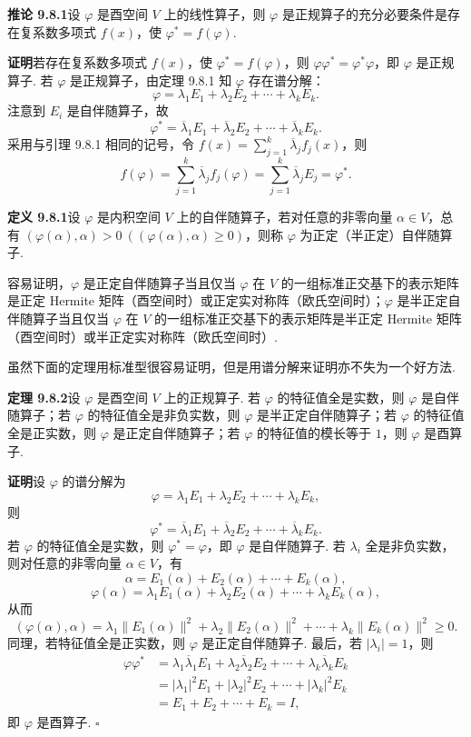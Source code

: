 \documentclass[UTF8,12pt,a4paper,fontset=fandol]{ctexart}
\begin{document}
\noindent\textbf{推论 9.8.1}\quad 设 $\varphi$ 是酉空间 $V$ 上的线性算子，则 $\varphi$ 是正规算子的充分必要条件是存在复系数多项式 $f(x)$，使 $\varphi^*=f(\varphi)$.

\noindent\textbf{证明}\quad 若存在复系数多项式 $f(x)$，使 $\varphi^*=f(\varphi)$，则 $\varphi\varphi^*=\varphi^*\varphi$，即 $\varphi$ 是正规算子. 若 $\varphi$ 是正规算子，由定理 9.8.1 知 $\varphi$ 存在谱分解：
\[
  \varphi=\lambda_1E_1+\lambda_2E_2+\cdots+\lambda_kE_k.
\]
注意到 $E_i$ 是自伴随算子，故
\[
  \varphi^*=\overline\lambda_1E_1+\overline\lambda_2E_2+\cdots+\overline\lambda_kE_k.
\]
采用与引理 9.8.1 相同的记号，令 $f(x)=\sum_{j=1}^k\overline\lambda_j f_j(x)$，则
\[
  f(\varphi)=\sum_{j=1}^k\overline\lambda_j f_j(\varphi)=\sum_{j=1}^k\overline\lambda_j E_j=\varphi^*.
\]

\noindent\textbf{定义 9.8.1}\quad 设 $\varphi$ 是内积空间 $V$ 上的自伴随算子，若对任意的非零向量 $\alpha\in V$，总有 $(\varphi(\alpha),\alpha)>0\ ((\varphi(\alpha),\alpha)\ge0)$，则称 $\varphi$ 为正定（半正定）自伴随算子.

容易证明，$\varphi$ 是正定自伴随算子当且仅当 $\varphi$ 在 $V$ 的一组标准正交基下的表示矩阵是正定 Hermite 矩阵（酉空间时）或正定实对称阵（欧氏空间时）；$\varphi$ 是半正定自伴随算子当且仅当 $\varphi$ 在 $V$ 的一组标准正交基下的表示矩阵是半正定 Hermite 矩阵（酉空间时）或半正定实对称阵（欧氏空间时）.

虽然下面的定理用标准型很容易证明，但是用谱分解来证明亦不失为一个好方法.

\noindent\textbf{定理 9.8.2}\quad 设 $\varphi$ 是酉空间 $V$ 上的正规算子. 若 $\varphi$ 的特征值全是实数，则 $\varphi$ 是自伴随算子；若 $\varphi$ 的特征值全是非负实数，则 $\varphi$ 是半正定自伴随算子；若 $\varphi$ 的特征值全是正实数，则 $\varphi$ 是正定自伴随算子；若 $\varphi$ 的特征值的模长等于 $1$，则 $\varphi$ 是酉算子.

\noindent\textbf{证明}\quad 设 $\varphi$ 的谱分解为
\[
  \varphi=\lambda_1E_1+\lambda_2E_2+\cdots+\lambda_kE_k,
\]
则
\[
  \varphi^*=\overline\lambda_1E_1+\overline\lambda_2E_2+\cdots+\overline\lambda_kE_k.
\]
若 $\varphi$ 的特征值全是实数，则 $\varphi^*=\varphi$，即 $\varphi$ 是自伴随算子. 若 $\lambda_i$ 全是非负实数，则对任意的非零向量 $\alpha\in V$，有
\[
  \alpha=E_1(\alpha)+E_2(\alpha)+\cdots+E_k(\alpha),
\]
\[
  \varphi(\alpha)=\lambda_1E_1(\alpha)+\lambda_2E_2(\alpha)+\cdots+\lambda_kE_k(\alpha),
\]
从而
\[
  (\varphi(\alpha),\alpha)=\lambda_1\|E_1(\alpha)\|^2+\lambda_2\|E_2(\alpha)\|^2+\cdots+\lambda_k\|E_k(\alpha)\|^2\ge0.
\]
同理，若特征值全是正实数，则 $\varphi$ 是正定自伴随算子. 最后，若 $|\lambda_i|=1$，则
\[
\begin{aligned}
  \varphi\varphi^*
  &= \lambda_1\overline\lambda_1E_1+\lambda_2\overline\lambda_2E_2+\cdots+\lambda_k\overline\lambda_kE_k\\
  &= |\lambda_1|^2E_1+|\lambda_2|^2E_2+\cdots+|\lambda_k|^2E_k\\
  &= E_1+E_2+\cdots+E_k=I,
\end{aligned}
\]
即 $\varphi$ 是酉算子. $\square$
\end{document}
